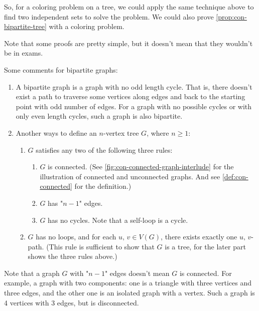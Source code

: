\documentclass[../src/handouts/main.tex]{subfiles}
\begin{document}
So, for a coloring problem on a tree, we could apply the same technique above to find two independent sets to solve the problem. We could also prove \cref{prop:con-bipartite-tree} with a coloring problem. %

Note that some proofs are pretty simple, but it doesn't mean that they wouldn't be in exams.

Some comments for bipartite graphs:
\begin{enumerate}
  \item \label{enum:con-bipartite-odd} A bipartite graph is a graph with no odd length cycle. That is, there doesn't exist a path to traverse some vertices along edges and back to the starting point with odd number of edges. For a graph with no possible cycles or with only even length cycles, such a graph is also bipartite. 

  \item Another ways to define an $n$-vertex tree $G$, where $n \geq 1$:
        \begin{enumerate}
          \item $G$ satisfies any two of the following three rules:
                \begin{enumerate}
                  \item $G$ is connected. (See \cref{fig:con-connected-graph-interlude} for the illustration of connected and unconnected graphs. And see \cref{def:con-connected} for the definition.)
                  \item $G$ has "$n - 1$" edges.
                  \item $G$ has no cycles. Note that a self-loop is a cycle.
                \end{enumerate}
          \item $G$ has no loops, and for each $u,\, v \in V(G)$, there exists exactly one $u,\, v$-path. (This rule is sufficient to show that $G$ is a tree, for the later part shows the three rules above.) %
        \end{enumerate}
\end{enumerate}

Note that a graph $G$ with "$n - 1$" edges doesn't mean $G$ is connected. For example, a graph with two components: one is a triangle with three vertices and three edges, and the other one is an isolated graph with a vertex. Such a graph is 4 vertices with 3 edges, but is disconnected.
\end{document}
